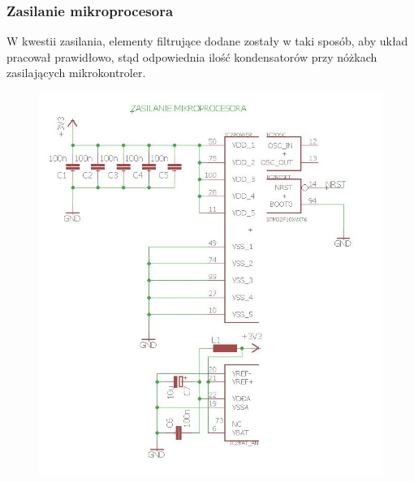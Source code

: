 \documentclass[12pt]{article}
\begin{document}
\subsubsection{Zasilanie mikroprocesora}
W kwestii zasilania, elementy filtrujące dodane zostały w taki sposób, aby układ pracował prawidłowo, stąd odpowiednia ilość kondensatorów przy nóżkach zasilających mikrokontroler.
\begin{figure}[H]
\begin{center}
\includegraphics[width=1\textwidth]{figures/schemat2.jpg}
\end{center}
\end{figure}
\end{document}
